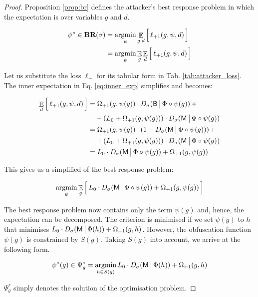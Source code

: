 \begin{proof}
    Proposition \ref{prop:br} defines the attacker's best response problem in which the expectation is over variables $g$ and $d$.

    \begin{align}
        \psi^* \in \textbf{BR}(\sigma) &= \mathop{\text{argmin}}_\psi \mathop{\mathbb{E}}_{g,d} \Big[\, \ell_{{\text{+}1}} (g, \psi, d) \,\Big] \\
        &= \mathop{\text{argmin}}_\psi \mathop{\mathbb{E}}_g \mathop{\mathbb{E}}_d \Big[\, \ell_{{\text{+}1}} (g, \psi, d) \,\Big] \label{eq:inner_exp}
    \end{align}

    Let us substitute the loss $\ell_\plus$ for its tabular form in Tab. \ref{tab:attacker_loss}. The inner expectation in Eq. \eqref{eq:inner_exp} simplifies and becomes:

    \begin{align}
        \mathop{\mathbb{E}}_d \Big[\, \ell_{{\text{+}1}} (g, \psi, d) \,\Big] & = \Omega_{{\text{+}1}} (g, \psi(g) ) \cdot D_\sigma(\mathsf{B} \,\big|\, \Phi \circ \psi (g)) \, + \\
        & \quad + (L_0 + \Omega_{{\text{+}1}}(g, \psi(g))) \cdot D_\sigma(\mathsf{M} \,\big|\, \Phi \circ \psi (g)) \\
        & = \Omega_{{\text{+}1}}(g, \psi(g)) \cdot ( 1 - D_\sigma(\mathsf{M} \,\big|\, \Phi \circ \psi (g)) ) \, + \\
        & \quad + (L_0 + \Omega_{{\text{+}1}}(g, \psi(g))) \cdot D_\sigma(\mathsf{M} \,\big|\, \Phi \circ \psi (g)) \\
        & = L_0 \cdot D_\sigma(\mathsf{M} \,\big|\, \Phi \circ \psi (g)) + \Omega_{{\text{+}1}}(g, \psi(g))
    \end{align}

    This gives us a simplified of the best response problem:

    \begin{equation}
        \mathop{\text{argmin}}_\psi \mathop{\mathbb{E}}_g \Big[\, L_0 \cdot D_\sigma(\mathsf{M} \,\big|\, \Phi \circ \psi (g)) + \Omega_{{\text{+}1}}(g, \psi(g)) \,\Big]
    \end{equation}

    The best response problem now contains only the term $\psi(g)$ and, hence, the expectation can be decomposed. The criterion is minimised if we set $\psi(g)$ to $h$ that minimises $L_0 \cdot D_\sigma(\mathsf{M} \,\big|\, \Phi (h)) + \Omega_{{\text{+}1}}(g, h)$. However, the obfuscation function $\psi(g)$ is constrained by $S(g)$. Taking $S(g)$ into account, we arrive at the following form.

    \begin{equation}
        \psi^*(g) \in \Psi^*_g = \mathop{\text{argmin}}_{h \in S(g)} L_0 \cdot D_\sigma(\mathsf{M} \,\big|\, \Phi (h) ) + \Omega_{{\text{+}1}}(g, h)
    \end{equation}

    $\Psi^*_g$ simply denotes the solution of the optimisation problem.

\end{proof}

